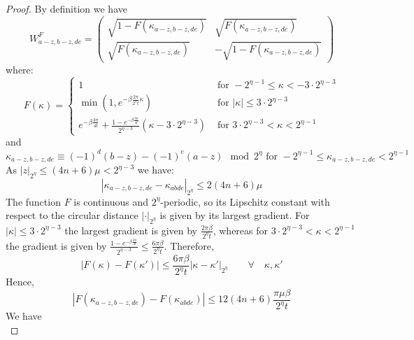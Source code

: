 \documentclass[aps,floatfix,10pt,amssymb,amsfont,amsmath,superscriptaddress,float,nofootinbib,longbibliography,nobalancelastpage,twocolumn]{revtex4-2}
\begin{document}
\begin{proof}
    By definition we have
\begin{equation}
     W^F_{a-z,b-z,de} = \begin{pmatrix}
        \sqrt{1 - F(\kappa_{a-z,b-z,de})} & \sqrt{F(\kappa_{a-z,b-z,de})}\\
       \sqrt{F(\kappa_{a-z,b-z,de})} & -\sqrt{1 - F(\kappa_{a-z,b-z,de})}
    \end{pmatrix}
\end{equation}
where:
\begin{equation}
    F(\kappa) = \begin{cases}1& \text{ for }  -2^{\eta-1} \leq \kappa <  -3\cdot 2^{\eta-3}\\
        \min(1,e^{-\beta \frac{2\pi}{2^{\eta}t} \kappa}) & \text{ for } |\kappa|\leq 3\cdot 2^{\eta-3}\\
        e^{-\beta\frac{3\pi}{4t}} + \frac{1- e^{-\beta\frac{3\pi}{4t}}}{2^{\eta-3}}(\kappa - 3\cdot 2^{\eta-3}) & \text{ for }  3\cdot 2^{\eta-3} < \kappa <  2^{\eta-1}
    \end{cases}
\end{equation}
and
\begin{equation}
    \kappa_{a-z,b-z,de} \equiv (-1)^d(b-z) - (-1)^e(a-z) \mod 2^{\eta} \text{ for } -2^{\eta-1} \leq \kappa_{a-z,b-z,de} < 2^{\eta-1}
\end{equation}
As $|z|_{2^{\eta}} \leq (4n+6)\mu< 2^{\eta-3}$  we have:
\begin{equation}
    |\kappa_{a-z,b-z,de} - \kappa_{abde}|_{2^{\eta}} \leq 2(4n+6)\mu
\end{equation}
The function $F$ is continuous and $2^{\eta}$-periodic, so its Lipschitz constant with respect to the circular distance $|\cdot|_{2^{\eta}}$ is given by its largest gradient. For $|\kappa|\leq 3\cdot 2^{\eta-3}$ the largest gradient is given by $\frac{2\pi\beta}{2^{\eta}t}$, whereas for $3\cdot 2^{\eta-3} < \kappa <  2^{\eta-1}$ the gradient is given by $\frac{1- e^{-\beta\frac{3\pi}{4t}}}{2^{\eta-3}} \leq \frac{6\pi\beta}{2^{\eta}t}$. Therefore,
\begin{equation}
     |F(\kappa)-F(\kappa')|\leq \frac{6\pi\beta}{2^{\eta}t}|\kappa - \kappa'|_{2^{\eta}} \qquad \forall \quad \kappa, \kappa'
\end{equation}
Hence,
\begin{equation}
    |F(\kappa_{a-z,b-z,de})-F(\kappa_{abde})|\leq 12(4n+6)\frac{\pi\mu\beta}{2^{\eta}t}
\end{equation}
We have
\begin{equation}

\end{equation}
\end{proof}
\end{document}
